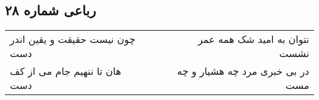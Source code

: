 \begin{center}
\section*{رباعی شماره ۲۸}
\label{sec:sh028}
\begin{longtable}{l p{0.5cm} r}
چون نیست حقیقت و یقین اندر دست
&&
نتوان به امید شک همه عمر نشست
\\
هان تا ننهیم جام می از کف دست
&&
در بی خبری مرد چه هشیار و چه مست
\\
\end{longtable}
\end{center}

